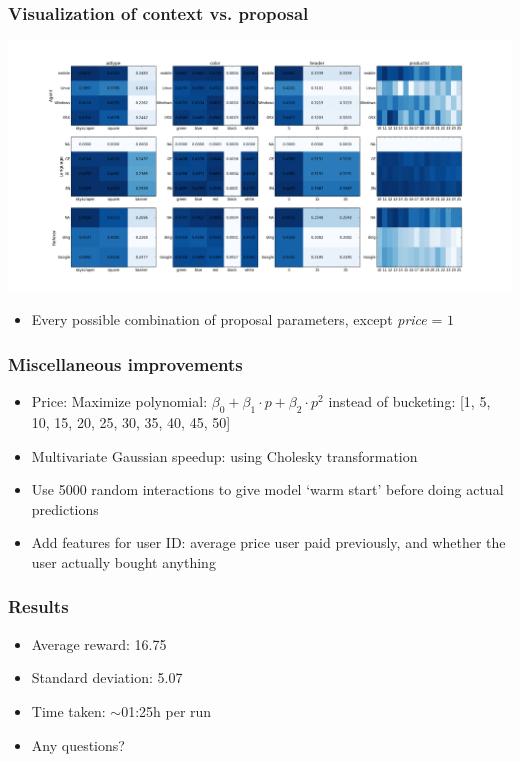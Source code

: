 \documentclass{beamer}
\begin{document}
\begin{frame}
	\frametitle{Visualization of context vs. proposal}
	\includegraphics[width=\textwidth]{viewer.png}
	\begin{itemize}
		\item Every possible combination of proposal parameters, except \emph{price} = $1$
	\end{itemize}
\end{frame}


\begin{frame}
	\frametitle{Miscellaneous improvements}
	\begin{itemize}
		\item<1,5| alert@5> Price: Maximize polynomial: $\beta_0 + \beta_1 \cdot p + \beta_2 \cdot p^2$ instead of bucketing: [1, 5, 10, 15, 20, 25, 30, 35, 40, 45, 50]
		\item<2,5| alert@5> Multivariate Gaussian speedup: using Cholesky transformation
		\item<3,5| alert@5> Use 5000 random interactions to give model `warm start' before doing actual predictions
		\item<4,5> Add features for user ID: average price user paid previously, and whether the user actually bought anything
	\end{itemize}
\end{frame}


\begin{frame}
  \frametitle{Results}

  \begin{itemize}
   	\item Average reward: 16.75
    \item Standard deviation: 5.07‏
    \item Time taken: $\sim$01:25h per run
    \item Any questions?
  \end{itemize}
\end{frame}
\end{document}
